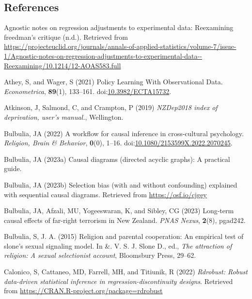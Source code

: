 \documentclass[
  singlecolumn]{article}
\newlength{\cslhangindent}
\newenvironment{CSLReferences}[2] %
 {\begin{list}{}{%
  \setlength{\itemindent}{0pt}
  \setlength{\leftmargin}{0pt}
  \setlength{\parsep}{0pt}
  \ifodd #1
   \setlength{\leftmargin}{\cslhangindent}
   \setlength{\itemindent}{-1\cslhangindent}
  \fi
  \setlength{\itemsep}{#2\baselineskip}}}
 {\end{list}}
\begin{document}
\newpage{}

\subsection*{References}\label{references}

\label{refs}
\begin{CSLReferences}{1}{0}
Agnostic notes on regression adjustments to experimental data:
Reexamining freedman{'}s critique (n.d.). Retrieved from
\url{https://projecteuclid.org/journals/annals-of-applied-statistics/volume-7/issue-1/Agnostic-notes-on-regression-adjustments-to-experimental-data--Reexamining/10.1214/12-AOAS583.full}

Athey, S, and Wager, S (2021) Policy Learning With Observational Data.
\emph{Econometrica}, \textbf{89}(1), 133--161.
doi:\href{https://doi.org/10.3982/ECTA15732}{10.3982/ECTA15732}.

Atkinson, J, Salmond, C, and Crampton, P (2019) \emph{NZDep2018 index of
deprivation, user{'}s manual.}, Wellington.

Bulbulia, JA (2022) A workflow for causal inference in cross-cultural
psychology. \emph{Religion, Brain \& Behavior}, \textbf{0}(0), 1--16.
doi:\href{https://doi.org/10.1080/2153599X.2022.2070245}{10.1080/2153599X.2022.2070245}.

Bulbulia, JA (2023a) Causal diagrams (directed acyclic graphs): A
practical guide.

Bulbulia, JA (2023b) Selection bias (with and without confounding)
explained with sequential causal diagrams. Retrieved from
\url{https://osf.io/cjgey}

Bulbulia, JA, Afzali, MU, Yogeeswaran, K, and Sibley, CG (2023)
Long-term causal effects of far-right terrorism in {N}ew {Z}ealand.
\emph{PNAS Nexus}, \textbf{2}(8), pgad242.

Bulbulia, S, J. A. (2015) Religion and parental cooperation: An
empirical test of slone's sexual signaling model. In \&. V. S. J. Slone
D., ed., \emph{The attraction of religion: A sexual selectionist
account}, Bloomsbury Press, 29--62.

Calonico, S, Cattaneo, MD, Farrell, MH, and Titiunik, R (2022)
\emph{Rdrobust: Robust data-driven statistical inference in
regression-discontinuity designs}. Retrieved from
\url{https://CRAN.R-project.org/package=rdrobust}


\end{CSLReferences}
\end{document}
